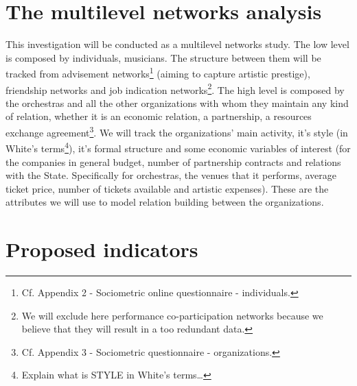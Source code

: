 \documentclass[a4paper, 12pt, openright, oneside, german, french, brazil, english]{abntex2}
\begin{document}
	\section{The multilevel networks analysis}
		

        This investigation will be conducted as a multilevel networks study. The low level is composed by individuals, musicians. The structure between them will be tracked from advisement networks\footnote{Cf. Appendix 2 - Sociometric online questionnaire - individuals.} (aiming to capture artistic prestige), friendship networks and job indication networks\footnote{We will exclude here performance co-participation networks because we believe that they will result in a too redundant data.}. The high level is composed by the orchestras and all the other organizations with whom they maintain any kind of relation, whether it is an economic relation, a partnership, a resources exchange agreement\footnote{Cf. Appendix 3 - Sociometric questionnaire - organizations.}. We will track the organizations' main activity, it's style (in White's terms\footnote{Explain what is STYLE in White's terms\dots}), it's formal structure and some economic variables of interest (for the companies in general budget, number of partnership contracts and relations with the State. Specifically for orchestras, the venues that it performs, average ticket price, number of tickets available and artistic expenses). These are the attributes we will use to model relation building between the organizations. 
	

       	\section{Proposed indicators}
	
\end{document}

